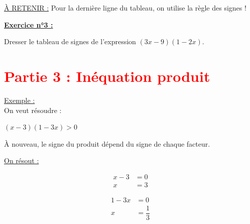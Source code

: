\documentclass[12pt]{article}
\begin{document}
\begin{mdframed}[
    linewidth=1pt,
    roundcorner=5pt,
    linecolor=red,
    innerbottommargin=10pt,
    innertopmargin=10pt
]
    {\color{red}\underline{À RETENIR :}}
    Pour la dernière ligne du tableau, on utilise la règle des signes !
\end{mdframed}

\begin{mdframed}[
    linewidth=1pt,
    linecolor=RoyalBlue,
    innertopmargin=10pt,
    innerbottommargin=10pt
]
{\color{RoyalBlue}\textbf{\underline{Exercice n°3 :}}}
\vspace{5pt}

Dresser le tableau de signes de l'expression $(3x-9)(1-2x)$.
\end{mdframed}

\vspace{20pt}
\newpage


\section*{\textcolor{red}{Partie 3 : Inéquation produit}}

\vspace{5pt}

\underline{Exemple :}
\vspace{5pt}\\On veut résoudre :
\begin{center}
    $(x-3)(1-3x) > 0$
\end{center}

À nouveau, le signe du produit dépend du signe de chaque facteur.

\vspace{10pt}
\underline{On résout :}\\
\begin{minipage}[t]{.25\textwidth}%
    \[
    \begin{aligned}
        x-3 &= 0\\
        x &= 3
    \end{aligned}
    \]
\end{minipage}%
\hfill
\begin{minipage}[t]{.75\textwidth}%
    \[
    \begin{aligned}
        1-3x &= 0\\
        x &= \dfrac{1}{3}
    \end{aligned}
    \]
\end{minipage}%
\end{document}
